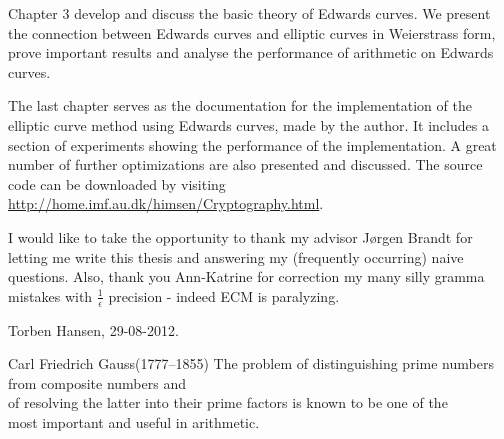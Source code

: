Chapter 3 develop and discuss the basic theory of Edwards curves. We present the connection between Edwards curves and  elliptic curves in Weierstrass form, prove important results and analyse the performance of arithmetic on Edwards curves.

The last chapter serves as the documentation for the implementation of the elliptic curve method using Edwards curves, made by the author. It includes a section of experiments showing the performance of the implementation. A great number of further optimizations are also presented and discussed. The source code can be downloaded by visiting \url{http://home.imf.au.dk/himsen/Cryptography.html}.

I would like to take the opportunity to thank my advisor Jørgen Brandt for letting me write this thesis and answering my (frequently occurring) naive questions. Also, thank you Ann-Katrine for correction my many silly gramma mistakes with $\frac{1}{\epsilon}$ precision - indeed ECM is paralyzing. \newline
\begin{flushright}
Torben Hansen, 29-08-2012.
\end{flushright}

\vfill
\begin{citat}{Carl Friedrich Gauss(1777--1855) %
}
The problem of distinguishing prime numbers from composite numbers 
and \\of resolving the latter into their prime factors is known to be 
one of the \\most important and useful in arithmetic.  
\end{citat}
%
